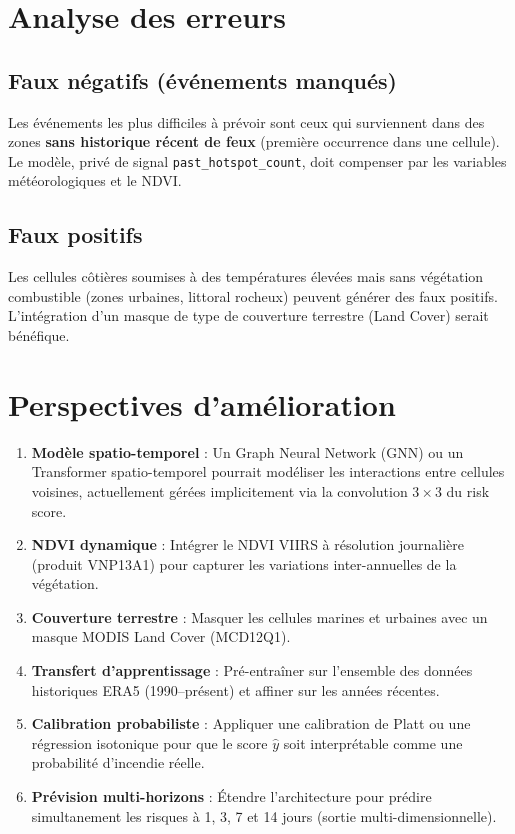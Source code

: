 \documentclass[12pt,a4paper]{report}
\begin{document}
\section{Analyse des erreurs}

\subsection{Faux négatifs (événements manqués)}

Les événements les plus difficiles à prévoir sont ceux qui surviennent dans des
zones \textbf{sans historique récent de feux} (première occurrence dans une cellule).
Le modèle, privé de signal \texttt{past\_hotspot\_count}, doit compenser par les
variables météorologiques et le NDVI.

\subsection{Faux positifs}

Les cellules côtières soumises à des températures élevées mais sans végétation
combustible (zones urbaines, littoral rocheux) peuvent générer des faux positifs.
L'intégration d'un masque de type de couverture terrestre (Land Cover) serait
bénéfique.

\section{Perspectives d'amélioration}

\begin{firebox}[title=Améliorations envisageables]
\begin{enumerate}[leftmargin=*,itemsep=4pt]
  \item \textbf{Modèle spatio-temporel} : Un Graph Neural Network (GNN) ou un
    Transformer spatio-temporel pourrait modéliser les interactions entre cellules
    voisines, actuellement gérées implicitement via la convolution $3\times3$ du risk score.
  \item \textbf{NDVI dynamique} : Intégrer le NDVI VIIRS à résolution journalière
    (produit VNP13A1) pour capturer les variations inter-annuelles de la végétation.
  \item \textbf{Couverture terrestre} : Masquer les cellules marines et urbaines
    avec un masque MODIS Land Cover (MCD12Q1).
  \item \textbf{Transfert d'apprentissage} : Pré-entraîner sur l'ensemble des
    données historiques ERA5 (1990–présent) et affiner sur les années récentes.
  \item \textbf{Calibration probabiliste} : Appliquer une calibration de Platt ou
    une régression isotonique pour que le score $\hat{y}$ soit interprétable comme
    une probabilité d'incendie réelle.
  \item \textbf{Prévision multi-horizons} : Étendre l'architecture pour prédire
    simultanement les risques à 1, 3, 7 et 14 jours (sortie multi-dimensionnelle).
\end{enumerate}
\end{firebox}
\end{document}
